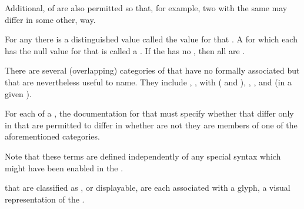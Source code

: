 
Additional,   of 
are also permitted
so that, for example, 
two  with the same  may differ 
in some other,  way.

For any  
there is a distinguished value
called the  value for that . 
A  for which each  
has the null value for that  is called a  .
If the  has no  ,
then all  are  .

\endSubsection%


There are several (overlapping) categories of  that have no formally
associated  but that are nevertheless useful to name. 
They include
      , 
      ,
      with  
       ( and  ),
      ,
      ,
 and  (in a given ).

For each   of a ,
the documentation for that  must specify whether 
 that differ only in that  are permitted to differ
in whether are not they are members of one of the aforementioned categories.

Note that these terms are defined independently of any special syntax 
which might have been enabled in the .


 that are classified as , or displayable, are each
associated with a glyph, a visual representation of the .


